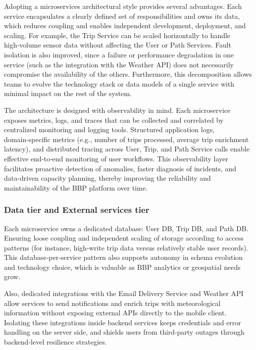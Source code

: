 Adopting a microservices architectural style provides several advantages. Each service encapsulates a clearly defined set of responsibilities and owns its data, which reduces coupling and enables independent development, deployment, and scaling. For example, the Trip Service can be scaled horizontally to handle high‑volume sensor data without affecting the User or Path Services. Fault isolation is also improved, since a failure or performance degradation in one service (such as the integration with the Weather API) does not necessarily compromise the availability of the others. Furthermore, this decomposition allows teams to evolve the technology stack or data models of a single service with minimal impact on the rest of the system.

The architecture is designed with observability in mind. Each microservice exposes metrics, logs, and traces that can be collected and correlated by centralized monitoring and logging tools. Structured application logs, domain‑specific metrics (e.g., number of trips processed, average trip enrichment latency), and distributed tracing across User, Trip, and Path Service calls enable effective end‑to‑end monitoring of user workflows. This observability layer facilitates proactive detection of anomalies, faster diagnosis of incidents, and data‑driven capacity planning, thereby improving the reliability and maintainability of the BBP platform over time.

\subsubsection*{Data tier and External services tier}

Each microservice owns a dedicated database: User DB, Trip DB, and Path DB. Ensuring loose coupling and independent scaling of storage according to access patterns (for instance, high‑write trip data versus relatively stable user records). This database‑per‑service pattern also supports autonomy in schema evolution and technology choice, which is valuable as BBP analytics or geospatial needs grow. 

Also, dedicated integrations with the Email Delivery Service and Weather API allow services to send notifications and enrich trips with meteorological information without exposing external APIs directly to the mobile client. Isolating these integrations inside backend services keeps credentials and error handling on the server side, and shields users from third‑party outages through backend‑level resilience strategies.

